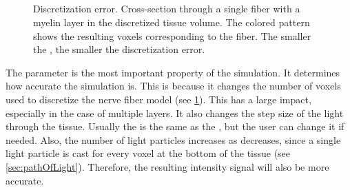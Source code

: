 \subsection{\Voxelsize}
%
\begin{figure}[!t]
\centering
\setlength{\tikzwidth}{.24\textwidth}

\caption{Discretization error. Cross-section through a single fiber with a myelin layer in the discretized tissue volume. The colored pattern shows the resulting voxels corresponding to the fiber. The smaller the \Voxelsize, the smaller the discretization error.}
\label{fig:vectorfield_disc_error}
\end{figure}
%
The parameter \Voxelsize{} is the most important property of the simulation.
It determines how accurate the simulation is.
This is because it changes the number of voxels used to discretize the nerve fiber model (see \cref{fig:vectorfield_disc_error}).
This has a large impact, especially in the case of multiple layers.
It also changes the step size of the light through the tissue.
Usually the \Stepsize is the same as the \Voxelsize, but the user can change it if needed.
Also, the number of light particles increases as \Voxelsize{} decreases, since a single light particle is cast for every voxel at the bottom of the tissue (see \cref{sec:pathOfLight}).
Therefore, the resulting intensity signal will also be more accurate.
%
%
% 
